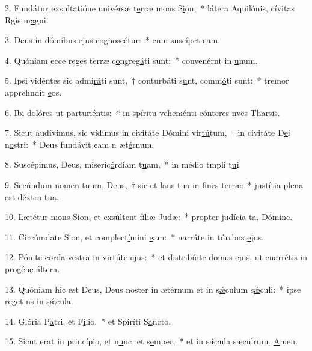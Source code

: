 2. Fundátur exsultatióne univérsæ t\uline{e}rræ mons S\uline{i}on,~* látera Aquilónis, cívitas Rgis m\uline{a}gni.\par 
3. Deus in dómibus ejus c\uline{o}gnosc\uline{é}tur:~* cum suscípet \uline{e}am.\par 
4. Quóniam ecce reges terræ c\uline{o}ngreg\uline{á}ti sunt:~* convenérnt in \uline{u}num.\par 
5. Ipsi vidéntes sic admi\uline{rá}ti sunt,~† conturbáti s\uline{u}nt, comm\uline{ó}ti sunt:~* tremor apprehndit \uline{e}os.\par 
6. Ibi dolóres ut part\uline{u}ri\uline{é}ntis:~* in spíritu veheménti cónteres nves Th\uline{a}rsis.\par 
7. Sicut audívimus, sic vídimus in civitáte Dómini vir\uline{tú}tum,~† in civitáte D\uline{e}i n\uline{o}stri:~* Deus fundávit eam n æt\uline{é}rnum.\par 
8. Suscépimus, Deus, miseric\uline{ó}rdiam t\uline{u}am,~* in médio tmpli t\uline{u}i.\par 
9. Secúndum nomen tuum, \uline{De}us,~† sic et laus tua in f\uline{i}nes t\uline{e}rræ:~* justítia plena est déxtra t\uline{u}a.\par 
10. Lætétur mons Sion, et exsúltent f\uline{í}liæ J\uline{u}dæ:~* propter judícia ta, D\uline{ó}mine.\par 
11. Circúmdate Sion, et complect\uline{í}mini \uline{e}am:~* narráte in túrrbus \uline{e}jus.\par 
12. Pónite corda vestra in virt\uline{ú}te \uline{e}jus:~* et distribúite domus ejus, ut enarrétis in progéne \uline{á}ltera.\par 
13. Quóniam hic est Deus, Deus noster in ætérnum et in s\uline{ǽ}culum s\uline{ǽ}culi:~* ipse reget ns in s\uline{ǽ}cula.\par 
14. Glória P\uline{a}tri, et F\uline{í}lio,~* et Spiríti S\uline{a}ncto.\par 
15. Sicut erat in princípio, et n\uline{u}nc, et s\uline{e}mper,~* et in sǽcula sæculrum. \uline{A}men.\par 
